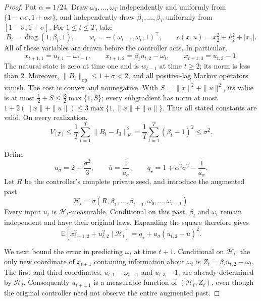 \documentclass[11pt]{article}
\theoremstyle{remark}
\newcommand{\E}{\mathbb E}
\newcommand{\op}{\mathrm{op}}
\begin{document}
\begin{proof}
Put $\alpha=1/24$.  Draw $\omega_0,\ldots,\omega_T$ independently
and uniformly from $\{1-\alpha\sigma,1+\alpha\sigma\}$, and independently
draw $\beta_1,\ldots,\beta_T$ uniformly from $[1-\sigma,1+\sigma]$.
For $1\le t\le T$, take
\[
 B_t=\operatorname{diag}(1,\beta_t,1),\qquad
 w_t=-(\omega_{t-1},\omega_t,1)^\top,\qquad
 c(x,u)=x_2^2+u_2^2+|x_1|.
\]
All of these variables are drawn before the controller acts.  In particular,
\[
 x_{t+1,1}=u_{t,1}-\omega_{t-1},\qquad
 x_{t+1,2}=\beta_tu_{t,2}-\omega_t,\qquad
 x_{t+1,3}=u_{t,3}-1.
\]
The natural state is zero at time one and is $w_{t-1}$ at time $t\ge2$;
its norm is less than $2$.  Moreover, $\|B_t\|_{\op}\le1+\sigma<2$,
and all positive-lag Markov operators vanish.  The cost is convex and
nonnegative.  With $S=\|x\|^2+\|u\|^2$, its value is at most
$\tfrac12+S\le\tfrac32\max\{1,S\}$; every subgradient has norm at most
$1+2(\|x\|+\|u\|)\le3\max\{1,\|x\|+\|u\|\}$.
Thus all stated constants are valid.  On every realization,
\[
 V_{[T]}
 \le\frac1T\sum_{t=1}^T\|B_t-I_3\|_F^2
 =\frac1T\sum_{t=1}^T(\beta_t-1)^2\le\sigma^2.
\]

Define
\[
 a_\sigma=2+\frac{\sigma^2}{3},\qquad
 \bar u=\frac1{a_\sigma},\qquad
 q_\star=1+\alpha^2\sigma^2-\frac1{a_\sigma}.
\]
Let $R$ be the controller's complete private seed, and introduce the
augmented past
\[
 \mathcal H_t=\sigma(R,\beta_1,\ldots,\beta_{t-1},
                         \omega_0,\ldots,\omega_{t-1}).
\]
Every input $u_t$ is $\mathcal H_t$-measurable.  Conditional on this past,
$\beta_t$ and $\omega_t$ remain independent and have their original laws.
Expanding the square therefore gives
\[
 \E\left[x_{t+1,2}^2+u_{t,2}^2\mid\mathcal H_t\right]
 =q_\star+a_\sigma(u_{t,2}-\bar u)^2.
\tag{A.1}\label{eq:varquad}
\]

We next bound the error in predicting $\omega_t$ at time $t+1$.
Conditional on $\mathcal H_t$, the only new coordinate of $x_{t+1}$
containing information about $\omega_t$ is
$Z_t=\beta_tu_{t,2}-\omega_t$.  The first and third coordinates,
$u_{t,1}-\omega_{t-1}$ and $u_{t,3}-1$, are already determined by
$\mathcal H_t$.  Consequently $u_{t+1,1}$ is a measurable function of
$(\mathcal H_t,Z_t)$, even though the original controller need not observe
the entire augmented past.


\end{proof}
\end{document}
